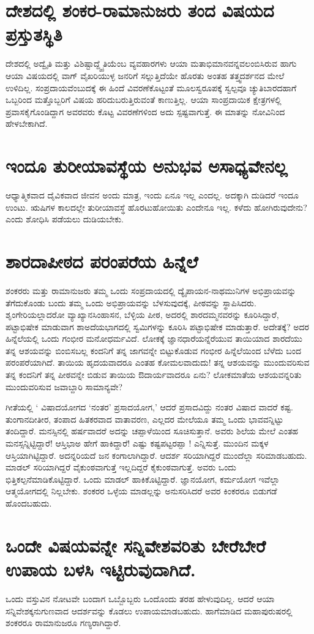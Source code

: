 \section*{ದೇಶದಲ್ಲಿ ಶಂಕರ-ರಾಮಾನುಜರು ತಂದ ವಿಷಯದ ಪ್ರಸ್ತುತಸ್ಥಿತಿ}

ದೇಶದಲ್ಲಿ ಅದ್ವೈತಿ ಮತ್ತು ವಿಶಿಷ್ಟಾದ್ದ್ವೈತಿಯೆಂಬ ವ್ಯವಹಾರಗಳು ಆಯಾ ಮತಾಭಿಮಾನವನ್ನವಲಂಬಿಸಿರುವ ಹಾಗು ಆಯಾ ವಿಷಯದಲ್ಲಿ ವಾಗ್ ವೈಖರಿಯುಳ್ಳ ಜನರಿಗೆ ಸಲ್ಲುತ್ತಿದೆಯೇ ಹೊರತು ಅಂತಹ ತತ್ತ್ವದರ್ಶನದ ಮೇಲೆ ಉಳಿದಿಲ್ಲ. ಸಂಪ್ರದಾಯವೆಂಬುದಕ್ಕೆ ಈ ಹಿಂದೆ ವಿವರಣೆಕೊಟ್ಟಂತೆ ಮೂಲಸ್ವರೂಪಕ್ಕೆ ಸ್ವಲ್ಪವೂ ಚ್ಯುತಿಬಾರದಹಾಗೆ ಒಬ್ಬರಿಂದ ಮತ್ತೊಬ್ಬರಿಗೆ ವಿಷಯ ಹರಿದುಬರುತ್ತಿರುವಂತೆ ಕಾಣುತ್ತಿಲ್ಲ. ಆಯಾ ಸಾಂಪ್ರದಾಯಿಕ ಕ್ಷೇತ್ರಗಳಲ್ಲಿ ಪ್ರವಾಸಕೈಗೊಂಡಿದ್ದಾಗ ಅವರವರು ಕೊಟ್ಟ ವಿವರಣೆಗಳಿಂದ ಅದು ಸ್ಪಷ್ಟವಾಗುತ್ತೆ. ಈ ಮಾತನ್ನು ನೋವಿನಿಂದ ಹೇಳಬೇಕಾಗಿದೆ.

\section*{ಇಂದೂ ತುರೀಯಾವಸ್ಥೆಯ ಅನುಭವ ಅಸಾಧ್ಯವೇನಲ್ಲ}

ಆಧ್ಯಾತ್ಮಿಕವಾದ ದೈವಿಕವಾದ ಜೀವನ ಅಂದು ಮಾತ್ರ, ಇಂದು ಏನೂ ಇಲ್ಲ ಎಂದಲ್ಲ. ಅದಕ್ಕಾಗಿ ದುಡಿದರೆ ಇಂದೂ ಉಂಟು. ಋಷಿಗಳ ಕಾಲದಲ್ಲೇ ತುರೀಯಾವಸ್ಥೆ ಹೊರಟುಹೋಯಿತು ಎಂದೇನೂ ಇಲ್ಲ. ಕಳೆದು ಹೋಗಿರುವುದೇನು? ಎಂದು ಶೋಧಿಸಿ ಪಡೆಯಲು ದುಡಿಯಬೇಕು.

\section*{ಶಾರದಾಪೀಠದ ಪರಂಪರೆಯ ಹಿನ್ನೆಲೆ}

ಶಂಕರರು ಮತ್ತು ರಾಮಾನುಜರು ತಮ್ಮ ಒಂದು ಸಂಪ್ರದಾಯದಲ್ಲಿ ದ್ಯೈಪಾಯನ-ನಾಥಮುನಿಗಳ ಅಭಿಪ್ರಾಯವನ್ನು ತೆಗೆದುಕೊಂಡು ಬಂದು ತಮ್ಮ ಒಂದು ಅಭಿಪ್ರಾಯವನ್ನು ಬೆಳಸುವುದಕ್ಕೆ, ಪೀಠವನ್ನು ಸ್ಥಾಪಿಸಿದರು. ಶೃಂಗೇರಿಯಲ್ಲಾದರೋ ವ್ಯಾಖ್ಯಾನಸಿಂಹಾಸನ, ಬೆಳ್ಳಿಯ ಪೀಠ, ಅದರಲ್ಲಿ ಶಾರದಮ್ಮನವರನ್ನು ಕೂರಿಸಿದ್ದಾರೆ, ಪಟ್ಟಾಭಿಷೇಕ ಮಾಡುವಾಗ ಶಾಅದೆಯಭಾಗದಲ್ಲಿ ಸ್ವಮಿಗಳನ್ನು ಕೂರಿಸಿ ಪಟ್ಟಾಭಿಷೇಕ ಮಾಡುತ್ತಾರೆ. ಅದೇತಕ್ಕೆ? ಅದರ ಹಿನ್ನೆಲೆಯಲ್ಲಿ ಒಂದು ಗಂಭೀರ ಮನೋಧರ್ಮವಿದೆ. ಲೋಕಕ್ಕೆ  ಜ್ಞಾನಧಾರೆಯನ್ನೆರೆಯುವ ತಾಯಿಯಾದ ಶಾರದೆಯು ತನ್ನ ಆಶಯವನ್ನು ಬಿಂಬಿಸಬಲ್ಲ ಕಂದನಿಗೆ ತನ್ನ ಜಾಗವನ್ನೇ ಬಿಟ್ಟುಕೊಡುವ ಗಂಭೀರ ಹಿನ್ನೆಲೆಯಿಂದ ಬೆಳೆದು ಬಂದ ಪರಂಪರೆಯಾಗಿದೆ. ತಾಯಿಯ ಹೃದಯವಾದರೂ ಎಂತಹ ಕೋಮಲವಾದುದು! ತನ್ನ ಆಶಯವನ್ನು ಮುಂದುವರಿಸುವ ತನ್ನ ಕಂದನಿಗೆ ತನ್ನ ಪೀಠವನ್ನೇ ಬಿಡುವ ತಾಯಿಯ ಔದಾರ್ಯವಾದರೂ ಏನು? ಲೋಕಮಾತೆಯ ಆಶಯವನ್ನರಿತು ಮುಂದುವರಿಸುವ ಜವಾಬ್ದಾರಿ ಸಾಮಾನ್ಯವೇ?

ಗೀತೆಯಲ್ಲಿ ` ವಿಷಾದಯೋಗದ `ನಂತರ' ಪ್ರಸಾದಯೋಗ,' ಆದರೆ ಪ್ರಸಾದವಿದ್ದು ನಂತರ ವಿಷಾದ ವಾದರೆ ಕಷ್ಟ. ತುಂಗಾನದೀತೀರ, ತಂಪಾದ ಹಿತಕರವಾದ ವಾತಾವರಣ, ಎಲ್ಲದರ ಮೇಲೆಯೂ ತಮ್ಮ ಒಂದು ಭಾವವನ್ನಿಟ್ಟು ತಂದಿದ್ದಾರೆ. ಮನಸ್ಸಿನಲ್ಲಿ ಹರ್ಷವಾದರೆ ಅದನ್ನು ಚಪ್ಪಾಳೆಯಿಂದ ಸೂಚಿಸುತ್ತಾನೆ. ಅವರು ಶಿಲೆಯ ಮೇಲೆ ಎಂತಹ ಮನಸ್ಸನ್ನಿಟ್ಟಿದ್ದಾರೆ! ಆಸ್ತಿಭಾಅ ಹೇಗೆ ಹಾಕಿದ್ದಾರೆ! ಎಷ್ಟು ಕಷ್ಟಪಟ್ಟರಪ್ಪಾ ! ಎನ್ನಿಸುತ್ತೆ. ಮುಂದಿನ ಮಕ್ಕಳ ಆಸ್ತಿಯಾಗಿಟ್ಟಿದ್ದಾರೆ. ಅದನ್ನರಿಯದೆ ಜನ ಕಂಗಾಲಾಗಿದ್ದಾರೆ. ಆದರ್ಶ ಸರಿಯಾಗಿದ್ದರೆ ಮುಂದೆಲ್ಲಾ ಸರಿಮಾಡಬಹುದು. ಮಾಡಲ್ ಸರಿಯಾಗಿದ್ದರೆ ವೈಕುಂಠವಾಗುತ್ತೆ ಇಲ್ಲದಿದ್ದರೆ ಕೈಕುಂಠವಾಗುತ್ತೆ. ಅವರು ಒಂದು ಭಿತ್ತಿಕಲ್ಪನೆಮಾಡಿಕೊಟ್ಟಿದ್ದಾರೆ. ಒಂದು ಮಾಡಲ್ ಹಾಕಿಕೊಟ್ಟಿದ್ದಾರೆ. ಜ್ಞಾನಯೋಗ, ಕರ್ಮಯೋಗ ಇವೆಲ್ಲಾ ಆತ್ಮಯೋಗದಲ್ಲಿ ನಿಲ್ಲಬೇಕು. ಶಂಕರರ ಒಳ್ಳೆಯ ಮಾಡಲ್ಲನ್ನು ಅನುಸರಿಸಿದರೆ ಅವರ ಕಿಂಕರರೂ ಬಿಡುಗಡೆ ಹೊಂದಬಹುದು.

\section*{ಒಂದೇ ವಿಷಯವನ್ನೇ ಸನ್ನಿವೇಶವರಿತು ಬೇರೆಬೇರೆ ಉಪಾಯ ಬಳಸಿ ಇಟ್ಟಿರುವುದಾಗಿದೆ.}

ಒಂದು ವಸ್ತುವಿನ ನೋಟವೇ ಬಂದಾಗ ಒಬ್ಬೊಬ್ಬರು ಒಂದೊಂದು ತರಹ ಹೇಳುವುದಿಲ್ಲ. ಆದರೆ ಆಯಾ ಸನ್ನಿವೇಶಕ್ಕನುಗುಣವಾದ ಆದರ್ಶವನ್ನು ಕೊಡಲು ಉಪಾಯಮಾಡಬಹುದು. ಹಾಗೆಮಾಡಿದ ಮಹಾಪುರುಷರಲ್ಲಿ ಶಂಕರರೂ ರಾಮಾನುಜರೂ ಗಣ್ಯರಾಗಿದ್ದಾರೆ.



